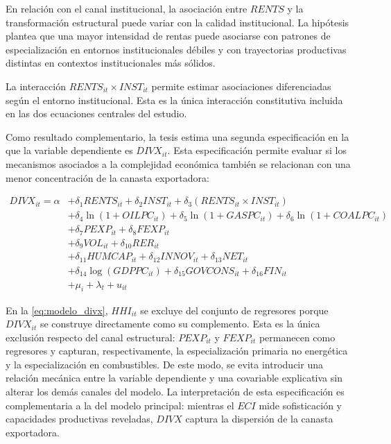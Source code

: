 \documentclass[../../TFM.tex]{subfiles}
\begin{document}
	En relación con el canal institucional, la asociación entre $RENTS$ y la transformación estructural puede variar con la
	calidad institucional. La hipótesis plantea que una mayor intensidad de rentas
	puede asociarse con patrones de especialización en entornos institucionales
	débiles y con trayectorias productivas distintas en contextos institucionales
	más sólidos.

	La interacción $RENTS_{it} \times INST_{it}$ permite estimar asociaciones
	diferenciadas según el entorno institucional. Esta es la única interacción
	constitutiva incluida en las dos ecuaciones centrales del estudio.

	Como resultado complementario, la tesis estima una segunda especificación en la que la variable dependiente es $DIVX_{it}$. Esta especificación permite evaluar si los mecanismos asociados a la complejidad económica también se relacionan con una menor concentración de la canasta exportadora:

	\begin{equation}
		\label{eq:modelo_divx}
		\begin{aligned}
			DIVX_{it} = \alpha
			&+ \delta_1 RENTS_{it}
			+ \delta_2 INST_{it}
			+ \delta_3(RENTS_{it} \times INST_{it}) \\
			&+ \delta_4 \ln(1+OILPC_{it})
			+ \delta_5 \ln(1+GASPC_{it})
			+ \delta_6 \ln(1+COALPC_{it}) \\
			&+ \delta_7 PEXP_{it}
			+ \delta_8 FEXP_{it} \\
			&+ \delta_9 VOL_{it}
			+ \delta_{10} RER_{it} \\
			&+ \delta_{11} HUMCAP_{it}
			+ \delta_{12} INNOV_{it}
			+ \delta_{13} NET_{it} \\
			&+ \delta_{14}\log(GDPPC_{it})
			+ \delta_{15} GOVCONS_{it}
			+ \delta_{16} FIN_{it} \\
			&+ \mu_i + \lambda_t + u_{it}
		\end{aligned}
	\end{equation}

	En la \autoref{eq:modelo_divx}, $HHI_{it}$ se excluye del conjunto de regresores porque $DIVX_{it}$ se construye directamente como su complemento. Esta es la única exclusión respecto del canal estructural: $PEXP_{it}$ y $FEXP_{it}$ permanecen como regresores y capturan, respectivamente, la especialización primaria no energética y la especialización en combustibles. De este modo, se evita introducir una relación mecánica entre la variable dependiente y una covariable explicativa sin alterar los demás canales del modelo. La interpretación de esta especificación es complementaria a la del modelo principal: mientras el $ECI$ mide sofisticación y capacidades productivas reveladas, $DIVX$ captura la dispersión de la canasta exportadora.
\end{document}
